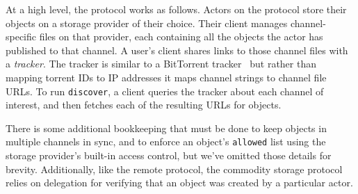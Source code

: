 At a high level, the protocol works as follows.
Actors on the protocol store their objects on a storage
provider of their choice.
Their client manages channel-specific files on that provider,
each containing all the objects the actor has published to that channel.
A user's client shares links to those channel files
with a \emph{tracker}.
The tracker is similar to a BitTorrent tracker~\cite{bittorrent} but
rather than mapping torrent IDs to IP addresses
it maps channel strings to channel file URLs.
To run \texttt{discover}, a client queries the tracker
about each channel of interest,
and then fetches each of the resulting URLs for objects.



There is some additional bookkeeping that must be done to
keep objects in multiple channels in sync, and to enforce an object's
\texttt{allowed} list using the storage provider's built-in access control,
but we've omitted those details for brevity.
Additionally, like the remote protocol, the commodity storage protocol
relies on delegation for verifying that an object was created by a particular actor.

